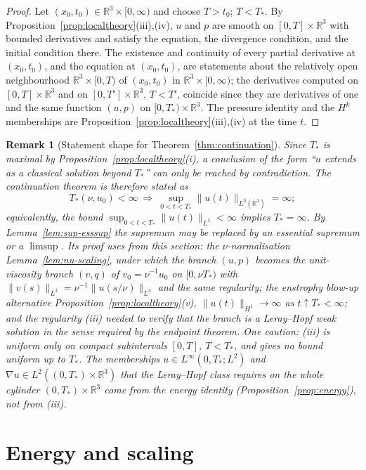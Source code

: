 \documentclass[11pt]{article}
\newtheorem{remark}[theorem]{Remark}
\theoremstyle{definition}
\theoremstyle{plain}
\newcommand{\R}{\mathbb R}
\newcommand{\norm}[1]{\lVert #1\rVert}
\begin{document}
\begin{proof}
Let $(x_0,t_0)\in\R^3\times[0,\infty)$ and choose $T>t_0$; $T<T_*$.  By
Proposition~\ref{prop:localtheory}(iii),(iv), $u$ and $p$ are smooth on
$[0,T]\times\R^3$ with bounded derivatives and satisfy the equation, the
divergence condition, and the initial condition there.  The existence and
continuity of every partial derivative at $(x_0,t_0)$, and the equation
at $(x_0,t_0)$, are statements about the relatively open neighbourhood
$\R^3\times[0,T)$ of $(x_0,t_0)$ in $\R^3\times[0,\infty)$; the
derivatives computed on $[0,T]\times\R^3$ and on $[0,T']\times\R^3$,
$T<T'$, coincide since they are derivatives of one and the same function
$(u,p)$ on $[0,T_*)\times\R^3$.  The pressure identity and the $H^k$
memberships are Proposition~\ref{prop:localtheory}(iii),(iv) at the time
$t$.
\end{proof}

\begin{remark}[Statement shape for Theorem~\ref{thm:continuation}]
\label{rem:continuation-shape}
Since $T_*$ is maximal by Proposition~\ref{prop:localtheory}(i), a
conclusion of the form ``$u$ extends as a classical solution beyond
$T_*$'' can only be reached by contradiction.  The continuation theorem
is therefore stated as
\[
 T_*(\nu,u_0)<\infty\ \Longrightarrow\
 \sup_{0<t<T_*}\norm{u(t)}_{L^3(\R^3)}=\infty ;
\]
equivalently, the bound $\sup_{0<t<T_*}\norm{u(t)}_{L^3}<\infty$
implies $T_*=\infty$.  By
Lemma~\ref{lem:sup-esssup} the supremum may be replaced by an essential
supremum or a $\limsup$.  Its proof uses from this section: the
$\nu$-normalisation Lemma~\ref{lem:nu-scaling}, under which the branch
$(u,p)$ becomes the unit-viscosity branch $(v,q)$ of $v_0=\nu^{-1}u_0$
on $[0,\nu T_*)$ with $\norm{v(s)}_{L^3}=\nu^{-1}\norm{u(s/\nu)}_{L^3}$
and the same regularity; the enstrophy blow-up alternative
Proposition~\ref{prop:localtheory}(v), $\norm{u(t)}_{H^1}\to\infty$ as
$t\uparrow T_*<\infty$; and the regularity (iii) needed to verify that
the branch is a Leray--Hopf weak solution in the sense required by the
endpoint theorem.  One caution: (iii) is uniform only on compact
subintervals $[0,T]$, $T<T_*$, and gives no bound uniform up to $T_*$.
The memberships $u\in L^\infty(0,T_*;L^2)$ and $\nabla u\in
L^2((0,T_*)\times\R^3)$ that the Leray--Hopf class requires on the whole
cylinder $(0,T_*)\times\R^3$ come from the energy identity
(Proposition~\ref{prop:energy}), not from (iii).
\end{remark}

\section{Energy and scaling}
\end{document}
